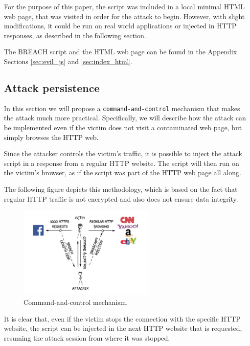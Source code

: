 For the purpose of this paper, the script was included in a local minimal HTML
web page, that was visited in order for the attack to begin. However, with
slight modifications, it could be run on real world applications or injected in
HTTP responses, as described in the following section.

The BREACH script and the HTML web page can be found in the Appendix Sections
\ref{sec:evil_js} and \ref{sec:index_html}.

\subsection{Attack persistence}\label{sec:persistence}

In this section we will propose a \texttt{command-and-control} mechanism that
makes the attack much more practical. Specifically, we will describe how the
attack can be implemented even if the victim does not visit a contaminated web
page, but simply browses the HTTP web.

Since the attacker controls the victim's traffic, it is possible to inject the
attack script in a response from a regular HTTP website. The script will then
run on the victim's browser, as if the script was part of the HTTP web page all
along.

The following figure depicts this methodology, which is based on the fact that
regular HTTP traffic is not encrypted and also does not ensure data integrity.

\begin{figure}[H] \caption{Command-and-control mechanism.} \centering
\includegraphics[width=0.6\textwidth]{diagrams/breach_mitm.png}\end{figure}

It is clear that, even if the victim stops the connection with the specific HTTP
website, the script can be injected in the next HTTP website that is requested,
resuming the attack session from where it was stopped.

